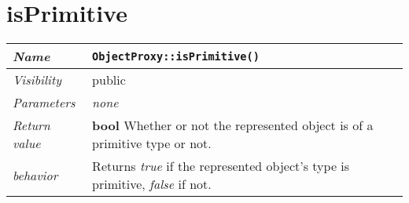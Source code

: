  \section{isPrimitive}
\begin{longtable}{p{3cm} @{\hskip 1cm} p{12cm}}
 \hline
\textit{Name} & \texttt{ObjectProxy::isPrimitive()}\\
\hline
 \textit{Visibility} & public\\
\hline
\textit{Parameters} & \textit{none}\\
\hline
\textit{Return value} & \textbf{bool} Whether or not the represented object is of a primitive type or not.\\
  \hline
  \textit{behavior} & Returns \textit{true} if the represented object's type is primitive, \textit{false} if not.\\
\hline
\end{longtable} \pagebreak

